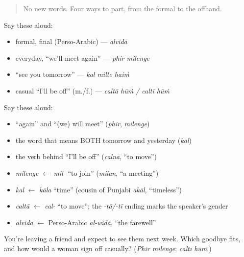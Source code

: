 \begin{quote}
No new words. Four ways to part, from the formal to the offhand.
\end{quote}

\begin{culture}
Say these aloud:

\begin{itemize}
\raggedright
  \item formal, final (Perso-Arabic) — \emph{alvidā}
  \item everyday, \textquotedblleft{}we'll meet again\textquotedblright{} — \emph{phir milenge}
  \item \textquotedblleft{}see you tomorrow\textquotedblright{} — \emph{kal milte haiṁ}
  \item casual \textquotedblleft{}I'll be off\textquotedblright{} (m./f.) — \emph{caltā hūṁ / caltī hūṁ}
\end{itemize}
\end{culture}

\begin{cousinweb}
Say these aloud:

\begin{itemize}
\raggedright
  \item \textquotedblleft{}again\textquotedblright{} and \textquotedblleft{}(we) will meet\textquotedblright{} (\emph{phir}, \emph{milenge})
  \item the word that means BOTH tomorrow and yesterday (\emph{kal})
  \item the verb behind \textquotedblleft{}I'll be off\textquotedblright{} (\emph{calnā}, \textquotedblleft{}to move\textquotedblright{})
\end{itemize}
\end{cousinweb}

\begin{grammarlens}[title={What you've built — roots you now carry}]
\begin{itemize}
\raggedright
  \item \emph{milenge} $\leftarrow$ \emph{mil-} \textquotedblleft{}to join\textquotedblright{} (\emph{milan}, \textquotedblleft{}a meeting\textquotedblright{})
  \item \emph{kal} $\leftarrow$ \emph{kāla} \textquotedblleft{}time\textquotedblright{} (cousin of Punjabi \emph{akāl}, \textquotedblleft{}timeless\textquotedblright{})
  \item \emph{caltā} $\leftarrow$ \emph{cal-} \textquotedblleft{}to move\textquotedblright{}; the \emph{-tā/-tī} ending marks the speaker's gender
  \item \emph{alvidā} $\leftarrow$ Perso-Arabic \emph{al-widā}, \textquotedblleft{}the farewell\textquotedblright{}
\end{itemize}
\end{grammarlens}

\begin{tcolorbox}[breakable,colback=teal!4,colframe=teal!35!black,title={Before you move on}]
You're leaving a friend and expect to see them next week. Which goodbye fits, and how would a woman sign off casually? (\emph{Phir milenge}; \emph{caltī hūṁ}.)
\end{tcolorbox}
